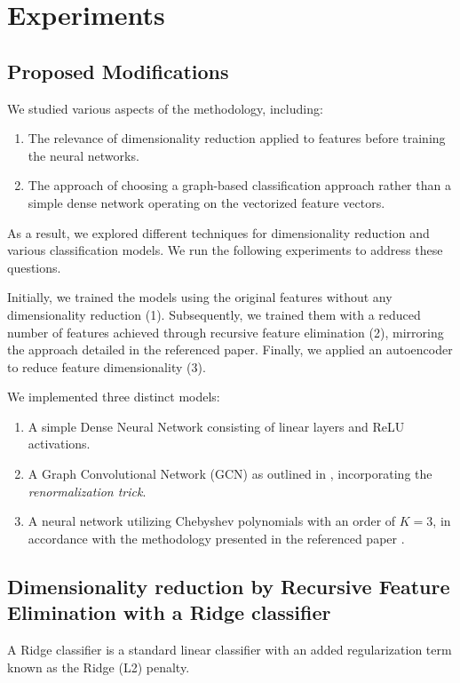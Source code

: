 \section{Experiments}

\subsection{Proposed Modifications}
We studied various aspects of the methodology, including:
\begin{enumerate}
    \item The relevance of dimensionality reduction applied to features before training the neural networks.
    \item The approach of choosing a graph-based classification approach rather than a simple dense network operating on the vectorized feature vectors.
\end{enumerate}
As a result, we explored different techniques for dimensionality reduction and various classification models. We run the following experiments to address these questions.

Initially, we trained the models using the original features without any dimensionality reduction (1). Subsequently, we trained them with a reduced number of features achieved through recursive feature elimination (2), mirroring the approach detailed in the referenced paper. Finally, we applied an autoencoder to reduce feature dimensionality (3).

We implemented three distinct models:
\begin{enumerate}
    \item A simple Dense Neural Network consisting of linear layers and ReLU activations.
    \item A Graph Convolutional Network (GCN) as outlined in \cite{kipf_semi-supervised_2017}, incorporating the \textit{renormalization trick}.
    \item A neural network utilizing Chebyshev polynomials with an order of $K=3$, in accordance with the methodology presented in the referenced paper \cite{Parisot17}.
\end{enumerate}


\subsection{Dimensionality reduction by Recursive Feature Elimination with a Ridge classifier}

A Ridge classifier is a standard linear classifier with an added regularization term known as the Ridge (L2) penalty.

